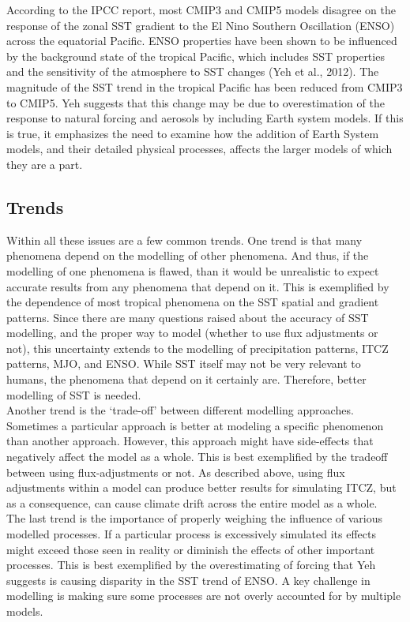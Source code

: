 According to the IPCC report, most CMIP3 and CMIP5 models disagree on the response of the zonal SST gradient to the El Nino Southern Oscillation (ENSO) across the equatorial Pacific.  ENSO properties have been shown to be influenced by the background state of the tropical Pacific, which includes SST properties and the sensitivity of the atmosphere to SST changes (Yeh et al., 2012).  The magnitude of the SST trend in the tropical Pacific has been reduced from CMIP3 to CMIP5.  Yeh suggests that this change may be due to overestimation of the response to natural forcing and aerosols by including Earth system models.  If this is true, it emphasizes the need to examine how the addition of Earth System models, and their detailed physical processes, affects the larger models of which they are a part.\\

\subsection{Trends}

Within all these issues are a few common trends.  One trend is that many phenomena depend on the modelling of other phenomena.  And thus, if the modelling of one phenomena is flawed, than it would be unrealistic to expect accurate results from any phenomena that depend on it.  This is exemplified by the dependence of most tropical phenomena on the SST spatial and gradient patterns.  Since there are many questions raised about the accuracy of SST modelling, and the proper way to model (whether to use flux adjustments or not), this uncertainty extends to the modelling of precipitation patterns, ITCZ patterns, MJO, and ENSO.  While SST itself may not be very relevant to humans, the phenomena that depend on it certainly are.  Therefore, better modelling of SST is needed. \\

Another trend is the ‘trade-off’ between different modelling approaches.  Sometimes a particular approach is better at modeling a specific phenomenon than another approach.
However, this approach might have side-effects that negatively affect the model as a whole.
This is best exemplified by the tradeoff between using flux-adjustments or not.
As described above, using flux adjustments within a model can produce better results for simulating ITCZ, but as a consequence, can cause climate drift across the entire model as a whole.\\

The last trend is the importance of properly weighing the influence of various modelled processes.
If a particular process is excessively simulated its effects might exceed those seen in reality or diminish the effects of other important processes.  This is best exemplified by the overestimating of forcing that Yeh suggests is causing disparity in the SST trend of ENSO.
A key challenge in modelling is making sure some processes are not overly accounted for by multiple models.\\


